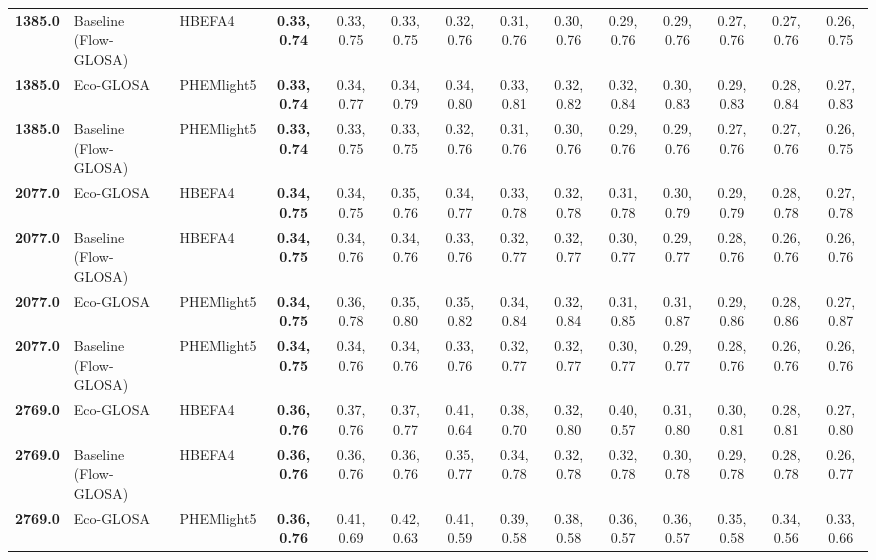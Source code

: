 \begin{table}[htb]
{\begin{tabular}{l l l *{11}{c}}
      \textbf{1385.0}& Baseline (Flow-GLOSA)       & HBEFA4      & \textbf{0.33, 0.74}  & 0.33, 0.75  & 0.33, 0.75  & 0.32, 0.76  & 0.31, 0.76  & 0.30, 0.76  & 0.29, 0.76  & 0.29, 0.76  & 0.27, 0.76  & 0.27, 0.76  & 0.26, 0.75  \\
      \textbf{1385.0}& Eco-GLOSA                   & PHEMlight5  & \textbf{0.33, 0.74}  & 0.34, 0.77  & 0.34, 0.79  & 0.34, 0.80  & 0.33, 0.81  & 0.32, 0.82  & 0.32, 0.84  & 0.30, 0.83  & 0.29, 0.83  & 0.28, 0.84  & 0.27, 0.83  \\
      \textbf{1385.0}& Baseline (Flow-GLOSA)       & PHEMlight5  & \textbf{0.33, 0.74}  & 0.33, 0.75  & 0.33, 0.75  & 0.32, 0.76  & 0.31, 0.76  & 0.30, 0.76  & 0.29, 0.76  & 0.29, 0.76  & 0.27, 0.76  & 0.27, 0.76  & 0.26, 0.75  \\
      \midrule
      \textbf{2077.0}& Eco-GLOSA                   & HBEFA4      & \textbf{0.34, 0.75}  & 0.34, 0.75  & 0.35, 0.76  & 0.34, 0.77  & 0.33, 0.78  & 0.32, 0.78  & 0.31, 0.78  & 0.30, 0.79  & 0.29, 0.79  & 0.28, 0.78  & 0.27, 0.78  \\
      \textbf{2077.0}& Baseline (Flow-GLOSA)       & HBEFA4      & \textbf{0.34, 0.75}  & 0.34, 0.76  & 0.34, 0.76  & 0.33, 0.76  & 0.32, 0.77  & 0.32, 0.77  & 0.30, 0.77  & 0.29, 0.77  & 0.28, 0.76  & 0.26, 0.76  & 0.26, 0.76  \\
      \textbf{2077.0}& Eco-GLOSA                   & PHEMlight5  & \textbf{0.34, 0.75}  & 0.36, 0.78  & 0.35, 0.80  & 0.35, 0.82  & 0.34, 0.84  & 0.32, 0.84  & 0.31, 0.85  & 0.31, 0.87  & 0.29, 0.86  & 0.28, 0.86  & 0.27, 0.87  \\
      \textbf{2077.0}& Baseline (Flow-GLOSA)       & PHEMlight5  & \textbf{0.34, 0.75}  & 0.34, 0.76  & 0.34, 0.76  & 0.33, 0.76  & 0.32, 0.77  & 0.32, 0.77  & 0.30, 0.77  & 0.29, 0.77  & 0.28, 0.76  & 0.26, 0.76  & 0.26, 0.76  \\
      \midrule
      \textbf{2769.0}& Eco-GLOSA                   & HBEFA4      & \textbf{0.36, 0.76}  & 0.37, 0.76  & 0.37, 0.77  & 0.41, 0.64  & 0.38, 0.70  & 0.32, 0.80  & 0.40, 0.57  & 0.31, 0.80  & 0.30, 0.81  & 0.28, 0.81  & 0.27, 0.80  \\
      \textbf{2769.0}& Baseline (Flow-GLOSA)       & HBEFA4      & \textbf{0.36, 0.76}  & 0.36, 0.76  & 0.36, 0.76  & 0.35, 0.77  & 0.34, 0.78  & 0.32, 0.78  & 0.32, 0.78  & 0.30, 0.78  & 0.29, 0.78  & 0.28, 0.78  & 0.26, 0.77  \\
      \textbf{2769.0}& Eco-GLOSA                   & PHEMlight5  & \textbf{0.36, 0.76}  & 0.41, 0.69  & 0.42, 0.63  & 0.41, 0.59  & 0.39, 0.58  & 0.38, 0.58  & 0.36, 0.57  & 0.36, 0.57  & 0.35, 0.58  & 0.34, 0.56  & 0.33, 0.66  \\

\end{tabular}}
\end{table}
